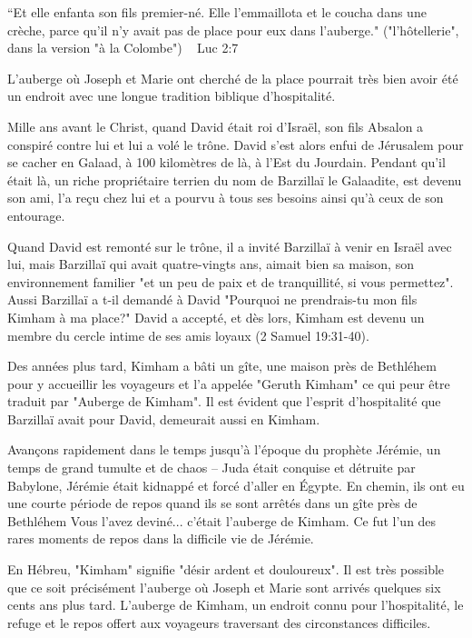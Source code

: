 

“Et elle enfanta son fils premier-né. Elle l’emmaillota et le coucha dans une crèche, parce qu’il n’y avait pas de place pour eux dans l’auberge." ("l'hôtellerie", dans la version "à la Colombe") ~ Luc 2:7

L'auberge où Joseph et Marie ont cherché de la place pourrait très bien avoir été un endroit avec une longue tradition biblique d'hospitalité.

Mille ans avant le Christ, quand David était roi d'Israël, son fils Absalon a conspiré contre lui et lui a volé le trône. David s'est alors enfui de Jérusalem pour se cacher en Galaad, à 100 kilomètres de là, à l'Est du Jourdain. Pendant qu'il était là, un riche propriétaire terrien du nom de Barzillaï le Galaadite, est devenu son ami, l'a reçu chez lui et a pourvu à tous ses besoins ainsi qu'à ceux de son entourage.

Quand David est remonté sur le trône, il a invité Barzillaï à venir en Israël avec lui, mais Barzillaï qui avait quatre-vingts ans, aimait bien sa maison, son environnement familier "et un peu de paix et de tranquillité, si vous permettez". Aussi Barzillaï a t-il demandé à David "Pourquoi ne prendrais-tu mon fils Kimham à ma place?" David a accepté, et dès lors, Kimham est devenu un membre du cercle intime de ses amis loyaux (2 Samuel 19:31-40).

Des années plus tard, Kimham a bâti un gîte, une maison près de Bethléhem pour y accueillir les voyageurs et l'a appelée "Geruth Kimham" ce qui peur être traduit par "Auberge de Kimham". Il est évident que l'esprit d'hospitalité que Barzillaï avait pour David, demeurait aussi en Kimham.

Avançons rapidement dans le temps jusqu'à l'époque du prophète Jérémie, un temps de grand tumulte et de chaos – Juda était conquise et détruite par Babylone, Jérémie était kidnappé et forcé d'aller en Égypte. En chemin, ils ont eu une courte période de repos quand ils se sont arrêtés dans un gîte près de Bethléhem Vous l'avez deviné... c'était l'auberge de Kimham. Ce fut l'un des rares moments de repos dans la difficile vie de Jérémie.

En Hébreu, "Kimham" signifie "désir ardent et douloureux". Il est très possible que ce soit précisément l'auberge où Joseph et Marie sont arrivés quelques six cents ans plus tard. L'auberge de Kimham, un endroit connu pour l'hospitalité, le refuge et le repos offert aux voyageurs traversant des circonstances difficiles.

